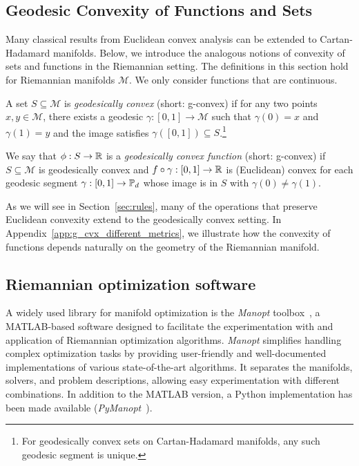 \documentclass[twoside,11pt]{article}
\begin{document}
\subsection{Geodesic Convexity of Functions and Sets}
Many classical results from Euclidean convex analysis can be extended to Cartan-Hadamard manifolds. Below, we introduce the analogous notions of convexity of sets and functions in the Riemannian setting. The definitions in this section hold for Riemannian manifolds
$\mathcal{M}$. We only consider functions that are continuous. 
%
\begin{definition}\label{def:g-convex-s}
A set $S \subseteq \mathcal{M}$ is \emph{geodesically convex} (short: g-convex) if for any two points $x,y \in \mathcal{M}$, there exists a geodesic $\gamma:[0,1] \to  \mathcal{M}$ such that $\gamma(0) = x$ and $\gamma(1) = y$ and the image satisfies $\gamma([0,1]) \subseteq S$.\footnote{For geodesically convex sets on Cartan-Hadamard manifolds, any such geodesic segment is unique.}
\end{definition}
%
\begin{definition}
\label{def:g-convex-f}
    We say that $\phi: S \to \mathbb{R}$ is a \emph{geodesically convex function} (short: g-convex) if $S \subseteq \mathcal{M}$ is geodesically convex and $f \circ \gamma :[0,1] \to \mathbb{R}$ is (Euclidean) convex for each geodesic segment $\gamma :[0,1] \to \mathbb{P}_d$ whose image is in $S$ with $\gamma(0) \neq \gamma(1)$.
\end{definition}
%

As we will see in Section~\ref{sec:rules}, many of the operations that preserve Euclidean convexity extend to the geodesically convex setting. In Appendix~\ref{app:g_cvx_different_metrics}, we illustrate how the convexity of functions depends naturally on the geometry of the Riemannian manifold. 
 

\subsection{Riemannian optimization software}

A widely used library for manifold optimization is the \textsl{Manopt} toolbox~\citep{manopt}, a MATLAB-based software designed to facilitate the experimentation with and application of Riemannian optimization algorithms. \textsl{Manopt} simplifies handling complex optimization tasks by providing user-friendly and well-documented implementations of various state-of-the-art algorithms. It separates the manifolds, solvers, and problem descriptions, allowing easy experimentation with different combinations. 
In addition to the MATLAB version, a Python implementation has been made available (\textsl{PyManopt}~\citep{pymanopt}).
\end{document}
